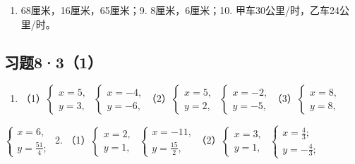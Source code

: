 \begin{enumerate}[start=8]
\item
  68厘米，16厘米，65厘米；9. 8厘米，6厘米；10.
  甲车30公里/时，乙车24公里/时。
\end{enumerate}

\subsection{习题8·3（1）}

\begin{enumerate}
\item
  （1）\(\left\{ \begin{array}{l} x = 5, \\ y = 3, \end{array} \right.\) \(\left\{ \begin{array}{l} x = -4, \\ y = -6, \end{array} \right.\)（2）\(\left\{ \begin{array}{l} x = 5, \\ y = 2, \end{array} \right.\) \(\left\{ \begin{array}{l} x = -2, \\ y = -5, \end{array} \right.\)（3）\(\left\{ \begin{array}{l} x = 8, \\ y = 8, \end{array} \right.\)
\end{enumerate}

\(\left\{ \begin{array}{l} x = 6, \\ y = \frac{51}{4}; \end{array} \right.\)
2.
（1）\(\left\{ \begin{array}{l} x = 2, \\ y = 1, \end{array} \right.\) \(\left\{ \begin{array}{l} x = -11, \\ y = \frac{15}{2}, \end{array} \right.\)（2）\(\left\{ \begin{array}{l} x = 3, \\ y = 1, \end{array} \right.\) \(\left\{ \begin{array}{l} x = \frac{4}{3}; \\ y = -\frac{4}{3}; \end{array} \right.\)

